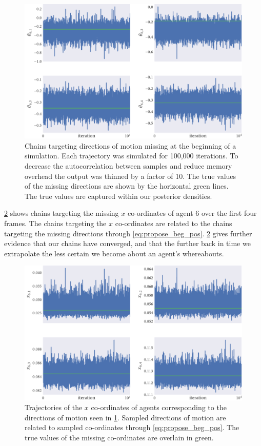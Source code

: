 \begin{figure}[tbp]
  \includegraphics{beg/dir_trace.pdf}
  \caption{Chains targeting directions of motion missing at the beginning of a
    simulation. Each trajectory was simulated for 100,000 iterations. To
    decrease the autocorrelation between samples and reduce memory overhead
    the output was thinned by a factor of 10. The true values of the
    missing directions are shown by the horizontal green lines. The true
    values are captured within our posterior densities.}
  \label{fig:beg_dir_trace}
\end{figure}

\cref{fig:beg_x_trace} shows chains targeting the missing $x$ co-ordinates of
agent 6 over the first four frames. The chains targeting the $x$ co-ordinates
are related to the chains targeting the missing directions through
\cref{eq:propose_beg_pos}. \cref{fig:beg_x_trace} gives further evidence that
our chains have converged, and that the further back in time we extrapolate the
less certain we become about an agent's whereabouts.

\begin{figure}[tbp]
  \includegraphics{beg/x_trace.pdf}
  \caption{Trajectories of the $x$ co-ordinates of agents corresponding to the
  directions of motion seen in \cref{fig:beg_dir_trace}. Sampled directions of
  motion are related to sampled co-ordinates through \cref{eq:propose_beg_pos}.
  The true values of the missing co-ordinates are overlain in green.}
  \label{fig:beg_x_trace}
\end{figure}

